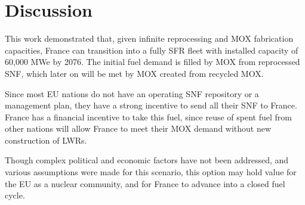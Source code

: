 \section{Discussion}
This work demonstrated that, given infinite
reprocessing and \gls{MOX} fabrication capacities,
France can transition into a fully \gls{SFR} fleet
with installed capacity of 60,000 MWe by 2076.
The initial fuel demand is filled by \gls{MOX} from
reprocessed \gls{SNF}, which later on
will be met by \gls{MOX} created from recycled \gls{MOX}.

Since most EU nations do not have an operating \gls{SNF}
repository or a management plan, they have a strong incentive
to send all their \gls{SNF} to France. France has a financial
incentive to take this fuel, since reuse of spent fuel from
other nations will allow France to meet their MOX demand
without new construction of \glspl{LWR}.

Though complex political and economic factors have not been
addressed, and various assumptions were made for this scenario,
this option may hold value for the EU as a nuclear community,
and for France to advance into a closed fuel cycle.